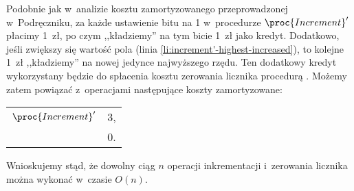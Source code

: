 Podobnie jak w~analizie kosztu zamortyzowanego przeprowadzonej w~Podręczniku, za każde ustawienie bitu na 1 w~procedurze $\proc{Increment}'$ płacimy 1~zł, po czym ,,kładziemy'' na tym bicie 1~zł jako kredyt.
Dodatkowo, jeśli zwiększy się wartość pola  (linia \ref{li:increment'-highest-increased}), to kolejne 1~zł ,,kładziemy'' na nowej jedynce najwyższego rzędu.
Ten dodatkowy kredyt wykorzystany będzie do spłacenia kosztu zerowania licznika procedurą .
Możemy zatem powiązać z~operacjami następujące koszty zamortyzowane:
\begin{flushleft}
	\begin{tabular}{lr}
		$\proc{Increment}'$ & 3, \\
		\proc{Reset} & 0.
	\end{tabular}
\end{flushleft}
Wnioskujemy stąd, że dowolny ciąg $n$ operacji inkrementacji i~zerowania licznika można wykonać w~czasie $O(n)$.
